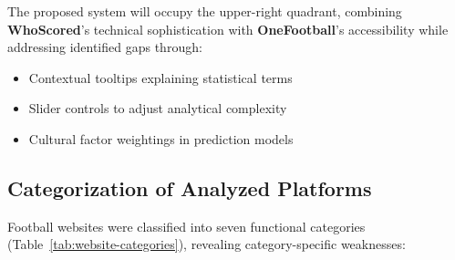 The proposed system will occupy the upper-right quadrant, combining \textbf{WhoScored}'s technical sophistication with \textbf{OneFootball}'s accessibility while addressing identified gaps through:
\begin{itemize}
    \item Contextual tooltips explaining statistical terms
    \item Slider controls to adjust analytical complexity
    \item Cultural factor weightings in prediction models
\end{itemize}

\subsection{Categorization of Analyzed Platforms}
Football websites were classified into seven functional categories (Table~\ref{tab:website-categories}), revealing category-specific weaknesses:

